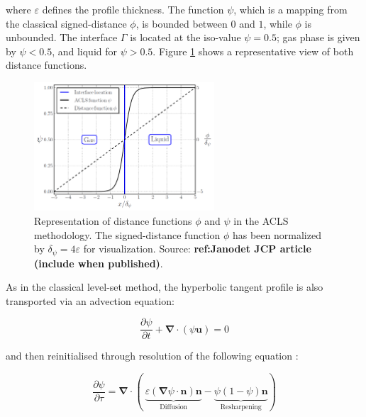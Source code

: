 where $\varepsilon$ defines the profile thickness. The function $\psi$, which is a mapping from the classical signed-distance $\phi$, is bounded between $0$ and $1$, while $\phi$ is unbounded. The interface $\Gamma$ is located at the iso-value $\psi = 0.5$; gas phase is given by $\psi < 0.5$, and liquid for $\psi > 0.5$. Figure \ref{fig:psi_phi_profiles_janodet_2021_JCP} shows a representative view of both distance functions.

\begin{figure}[ht]
    \centering
    \includegraphics[width=0.6\textwidth]{./part1_numerical_approaches/figures_ch2/ACLS_psi_phi_janodet_JCP}
       \centering
    \caption[Representation of distance functions $\phi$ and $\psi$ in the ACLS methodology]{Representation of distance functions $\phi$ and $\psi$ in the ACLS methodology. The signed-distance function $\phi$ has been normalized by $\delta_\psi = 4\varepsilon$ for visualization. Source: \textbf{ref:Janodet JCP article (include when published)}.}
    \label{fig:psi_phi_profiles_janodet_2021_JCP}
\end{figure}


As in the classical level-set method, the hyperbolic tangent profile is also transported via an advection equation:

\begin{equation}
    \frac{\partial \psi}{\partial t} + \boldsymbol{\nabla} \cdot \left( \psi \textbf{u} \right) = 0
\end{equation}

and then reinitialised through resolution of the following equation :


\begin{equation}
\label{eq:acls_reinit_2008}
\frac{\partial\psi}{\partial \tau}=\boldsymbol{\nabla}\cdot(\ \underbrace{\varepsilon(\boldsymbol{\nabla}\psi\cdot\textbf{n})\textbf{n}}_{\mathrm{Diffusion}}-\underbrace{\psi(1-\psi)\textbf{n}}_{\mathrm{Resharpening}})
\end{equation}

